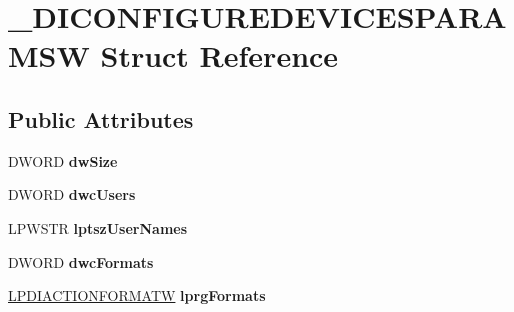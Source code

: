 \hypertarget{struct___d_i_c_o_n_f_i_g_u_r_e_d_e_v_i_c_e_s_p_a_r_a_m_s_w}{\section{\-\_\-\-D\-I\-C\-O\-N\-F\-I\-G\-U\-R\-E\-D\-E\-V\-I\-C\-E\-S\-P\-A\-R\-A\-M\-S\-W Struct Reference}
\label{struct___d_i_c_o_n_f_i_g_u_r_e_d_e_v_i_c_e_s_p_a_r_a_m_s_w}
}
\subsection*{Public Attributes}
\begin{DoxyCompactItemize}
\item 
\hypertarget{struct___d_i_c_o_n_f_i_g_u_r_e_d_e_v_i_c_e_s_p_a_r_a_m_s_w_a484eef6fe396a03a7fdb8062cb72b1b0}{D\-W\-O\-R\-D {\bfseries dw\-Size}}\label{struct___d_i_c_o_n_f_i_g_u_r_e_d_e_v_i_c_e_s_p_a_r_a_m_s_w_a484eef6fe396a03a7fdb8062cb72b1b0}

\item 
\hypertarget{struct___d_i_c_o_n_f_i_g_u_r_e_d_e_v_i_c_e_s_p_a_r_a_m_s_w_a7a0ad50176cf4a7d25f83c019a9dc03a}{D\-W\-O\-R\-D {\bfseries dwc\-Users}}\label{struct___d_i_c_o_n_f_i_g_u_r_e_d_e_v_i_c_e_s_p_a_r_a_m_s_w_a7a0ad50176cf4a7d25f83c019a9dc03a}

\item 
\hypertarget{struct___d_i_c_o_n_f_i_g_u_r_e_d_e_v_i_c_e_s_p_a_r_a_m_s_w_a8b141400e4d7bc3d65551ce350df1e5d}{L\-P\-W\-S\-T\-R {\bfseries lptsz\-User\-Names}}\label{struct___d_i_c_o_n_f_i_g_u_r_e_d_e_v_i_c_e_s_p_a_r_a_m_s_w_a8b141400e4d7bc3d65551ce350df1e5d}

\item 
\hypertarget{struct___d_i_c_o_n_f_i_g_u_r_e_d_e_v_i_c_e_s_p_a_r_a_m_s_w_a0aaa097ec77af3df6092f53c1ac03929}{D\-W\-O\-R\-D {\bfseries dwc\-Formats}}\label{struct___d_i_c_o_n_f_i_g_u_r_e_d_e_v_i_c_e_s_p_a_r_a_m_s_w_a0aaa097ec77af3df6092f53c1ac03929}

\item 
\hypertarget{struct___d_i_c_o_n_f_i_g_u_r_e_d_e_v_i_c_e_s_p_a_r_a_m_s_w_a24c975f010a586af1bd13cd82c162e69}{\hyperlink{struct___d_i_a_c_t_i_o_n_f_o_r_m_a_t_w}{L\-P\-D\-I\-A\-C\-T\-I\-O\-N\-F\-O\-R\-M\-A\-T\-W} {\bfseries lprg\-Formats}}\label{struct___d_i_c_o_n_f_i_g_u_r_e_d_e_v_i_c_e_s_p_a_r_a_m_s_w_a24c975f010a586af1bd13cd82c162e69}


\end{DoxyCompactItemize}
